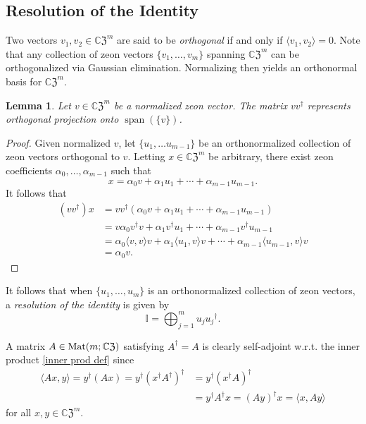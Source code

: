 \documentclass{article}
\newtheorem{lemma}[theorem]{Lemma}
\theoremstyle{definition}
\newcommand{\CZ}{\mathbb{C}\mathfrak{Z}}
\newcommand{\Mat}{{\rm Mat}}
\DeclareMathOperator{\spn}{span}
\newcommand{\mI}{\mathbb{I}}
\numberwithin{equation}{section}
\begin{document}
\subsection*{Resolution of the Identity}

Two vectors $v_1,v_2\in{\CZ}^m$ are said to be {\em orthogonal} if and only if $\langle v_1, v_2\rangle=0$.   Note that any collection of zeon vectors $\{v_1, \ldots, v_m\}$ spanning ${\CZ}^m$ can be orthogonalized via Gaussian elimination.  Normalizing then yields an orthonormal basis for ${\CZ}^m$.

\begin{lemma}
Let $v\in{\CZ}^m$ be a normalized zeon vector.  The matrix $vv^\dag$ represents orthogonal projection onto $\spn(\{v\})$.
\end{lemma}

\begin{proof}
Given normalized $v$, let $\{u_1, \ldots u_{m-1}\}$ be an orthonormalized collection of zeon vectors orthogonal to $v$.  Letting $x\in{\CZ}^m$ be arbitrary, there exist zeon coefficients $\alpha_0, \ldots, \alpha_{m-1}$ such that \begin{equation*}
x=\alpha_0 v+\alpha_1 u_1+\cdots+\alpha_{m-1}u_{m-1}.
\end{equation*}
It follows that \begin{align*}
(vv^\dag)x&=vv^\dag(\alpha_0 v+\alpha_1 u_1+\cdots+\alpha_{m-1}u_{m-1})\\
&=v \alpha_0 v^\dag v+\alpha_1 v^\dag u_1+\cdots+\alpha_{m-1}v^\dag u_{m-1}\\
&=\alpha_0 \langle v,v\rangle v+\alpha_1\langle u_1,v \rangle v+\cdots+\alpha_{m-1}\langle u_{m-1},v\rangle v\\
&=\alpha_0 v.
\end{align*} 
\end{proof}

It follows that when $\{u_1, \ldots, u_m\}$ is an orthonormalized collection of zeon vectors, a {\em resolution of the identity} is given by \begin{equation*}
\mI=\bigoplus_{j=1}^m u_j{u_j}^\dag.
\end{equation*}

A matrix $A\in\Mat(m;\CZ)$ satisfying $A^\dag=A$ is clearly self-adjoint w.r.t. the inner product \eqref{inner prod def} since \begin{align*}
\langle Ax, y\rangle=y^\dag (Ax)=y^\dag(x^\dag A^\dag)^\dag&=y^\dag(x^\dag A)^\dag\\
&=y^\dag A^\dag x=(Ay)^\dag x=\langle x, Ay\rangle
\end{align*}
for all $x,y\in{\CZ}^m$. 
\end{document}
